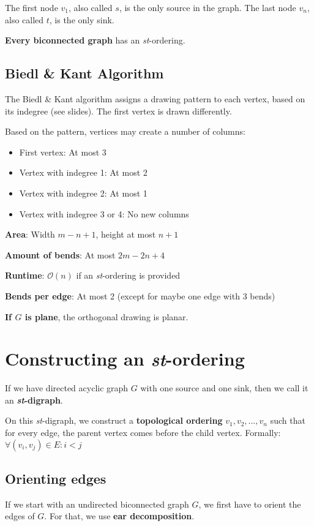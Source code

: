 \documentclass[10pt,a4paper]{article}
\begin{document}
The first node $v_1$, also called $s$, is the only source in the graph.
The last node $v_n$, also called $t$, is the only sink.

\textbf{Every biconnected graph} has an \textit{st}-ordering.

\subsection{Biedl \& Kant Algorithm}
The Biedl \& Kant algorithm assigns a drawing pattern to each vertex, based on
its indegree (see slides). The first vertex is drawn differently.

Based on the pattern, vertices may create a number of columns:
\begin{itemize}
    \item First vertex: At most 3
    \item Vertex with indegree 1: At most 2
    \item Vertex with indegree 2: At most 1
    \item Vertex with indegree 3 or 4: No new columns
\end{itemize}

\textbf{Area}: Width $m - n + 1$, height at most $n+1$

\textbf{Amount of bends}: At most $2m - 2n + 4$

\textbf{Runtime}: $\mathcal{O}(n)$ if an \textit{st}-ordering is provided

\textbf{Bends per edge}: At most 2 (except for maybe one edge with 3 bends)

\textbf{If $G$ is plane}, the orthogonal drawing is planar.

\section{Constructing an \textit{st}-ordering}
If we have directed acyclic graph $G$ with one source and one sink, then we
call it an \textbf{\textit{st}-digraph}.

On this \textit{st}-digraph, we construct a \textbf{topological ordering}
$v_1, v_2, \dots, v_n$ such that for every edge, the parent vertex comes before
the child vertex.
Formally: $\forall (v_i, v_j) \in E: i < j$

\subsection{Orienting edges}
If we start with an undirected biconnected graph $G$, we first have to orient
the edges of $G$.
For that, we use \textbf{ear decomposition}.
\end{document}
